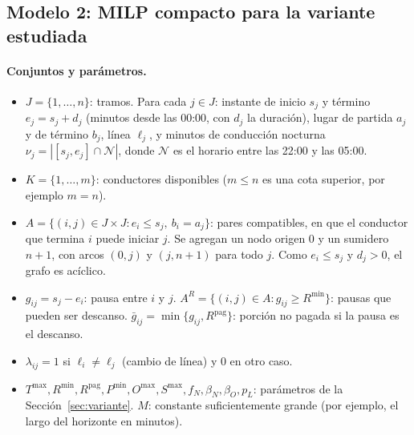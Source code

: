 \documentclass[letter, 10pt]{article}
\begin{document}
\subsection{Modelo 2: MILP compacto para la variante estudiada}

\paragraph{Conjuntos y parámetros.}
\begin{itemize}
\item $J=\{1,\dots,n\}$: tramos. Para cada $j\in J$: instante de inicio $s_j$ y término $e_j=s_j+d_j$ (minutos desde las 00:00, con $d_j$ la duración), lugar de partida $a_j$ y de término $b_j$, línea $\ell_j$, y minutos de conducción nocturna $\nu_j=|[s_j,e_j]\cap\mathcal{N}|$, donde $\mathcal{N}$ es el horario entre las 22:00 y las 05:00.
\item $K=\{1,\dots,m\}$: conductores disponibles ($m\leq n$ es una cota superior, por ejemplo $m=n$).
\item $A=\{(i,j)\in J\times J : e_i\leq s_j,\ b_i=a_j\}$: pares compatibles, en que el conductor que termina $i$ puede iniciar $j$. Se agregan un nodo origen $0$ y un sumidero $n{+}1$, con arcos $(0,j)$ y $(j,n{+}1)$ para todo $j$. Como $e_i\leq s_j$ y $d_j>0$, el grafo es acíclico.
\item $g_{ij}=s_j-e_i$: pausa entre $i$ y $j$. $A^R=\{(i,j)\in A: g_{ij}\geq R^{\min}\}$: pausas que pueden ser descanso. $\bar g_{ij}=\min\{g_{ij},R^{\text{pag}}\}$: porción no pagada si la pausa es el descanso.
\item $\lambda_{ij}=1$ si $\ell_i\neq\ell_j$ (cambio de línea) y 0 en otro caso.
\item $T^{\max}, R^{\min}, R^{\text{pag}}, P^{\min}, O^{\max}, S^{\max}, f_N, \beta_N, \beta_O, p_L$: parámetros de la Sección~\ref{sec:variante}. $M$: constante suficientemente grande (por ejemplo, el largo del horizonte en minutos).
\end{itemize}
\end{document}
